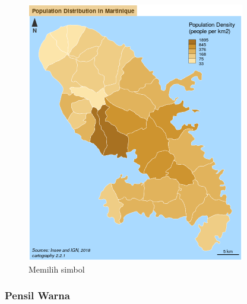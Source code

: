 \documentclass[]{book}
\begin{document}
\begin{figure}

{\centering \includegraphics[width=0.8\linewidth]{images/09/carto2} 

}

\caption{Memilih simbol}\label{fig:carto2}
\end{figure}

\hypertarget{pensil-warna}{%
\subsubsection{Pensil Warna}\label{pensil-warna}}
\end{document}
